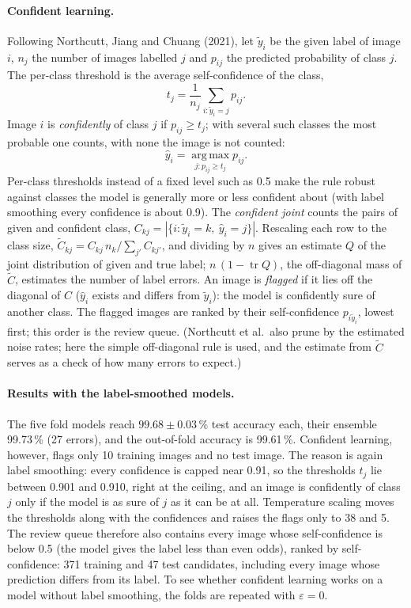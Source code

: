 \documentclass[11pt,a4paper]{article}
\newcommand{\1}{\mathbf{1}}
\begin{document}
\paragraph{Confident learning.} Following Northcutt, Jiang and Chuang (2021), let $\tilde y_i$
be the given label of image $i$, $n_j$ the number of images labelled $j$ and $p_{ij}$ the
predicted probability of class $j$. The per-class threshold is the average self-confidence of
the class,
\[
  t_j = \frac{1}{n_j} \sum_{i : \tilde y_i = j} p_{ij}.
\]
Image $i$ is \emph{confidently} of class $j$ if $p_{ij} \ge t_j$; with several such classes the
most probable one counts, with none the image is not counted:
\[
  \hat y_i = \operatorname*{arg\,max}_{j : p_{ij} \ge t_j} p_{ij}.
\]
Per-class thresholds instead of a fixed level such as 0.5 make the rule robust against classes
the model is generally more or less confident about (with label smoothing every confidence is
about 0.9). The \emph{confident joint} counts the pairs of given and confident class,
$C_{kj} = |\{i : \tilde y_i = k,\ \hat y_i = j\}|$. Rescaling each row to the class size,
$\tilde C_{kj} = C_{kj} \, n_k / \sum_{j'} C_{kj'}$, and dividing by $n$ gives an estimate $Q$ of
the joint distribution of given and true label; $n\,(1 - \operatorname{tr} Q)$, the off-diagonal
mass of $\tilde C$, estimates the number of label errors. An image is \emph{flagged} if it lies off
the diagonal of $C$ ($\hat y_i$ exists and differs from $\tilde y_i$): the model is confidently
sure of another class. The flagged images are ranked by their self-confidence
$p_{i \tilde y_i}$, lowest first; this order is the review queue. (Northcutt et al.\ also prune
by the estimated noise rates; here the simple off-diagonal rule is used, and the estimate from
$\tilde C$ serves as a check of how many errors to expect.)

\paragraph{Results with the label-smoothed models.} The five fold models reach
$99.68 \pm 0.03\,\%$ test accuracy each, their ensemble 99.73\,\% (27 errors), and the
out-of-fold accuracy is 99.61\,\%. Confident learning, however, flags only 10 training images
and no test image. The reason is again label smoothing: every confidence is capped near 0.91,
so the thresholds $t_j$ lie between 0.901 and 0.910, right at the ceiling, and an image is
confidently of class $j$ only if the model is as sure of $j$ as it can be at all. Temperature
scaling moves the thresholds along with the confidences and raises the flags only to 38 and 5.
The review queue therefore also contains every image whose self-confidence is below 0.5
(the model gives the label less than even odds), ranked by self-confidence: 371 training and
47 test candidates, including every image whose prediction differs from its label. To see
whether confident learning works on a model without label smoothing, the folds are repeated
with $\varepsilon = 0$.
\end{document}
